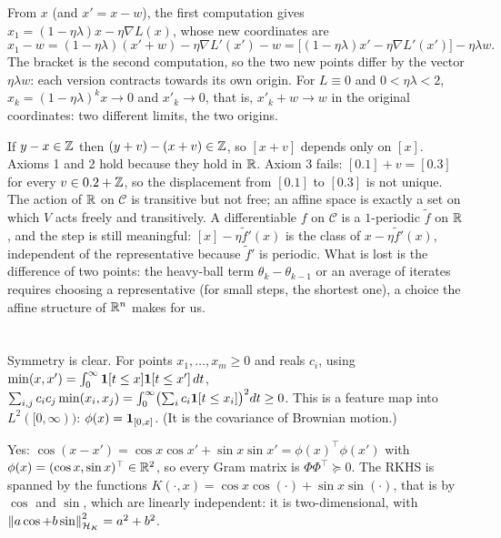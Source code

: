 From $x$ (and $x' = x - w$), the first computation gives $x_1 = (1 - \eta\lambda)x - \eta\nabla L(x)$, whose new
coordinates are
\[
  x_1 - w = (1 - \eta\lambda)(x' + w) - \eta\nabla L'(x') - w = \bigl[(1 - \eta\lambda)x' - \eta\nabla L'(x')\bigr] - \eta\lambda w .
\]
The bracket is the second computation, so the two new points differ by the vector $\eta\lambda w$: each
version contracts towards its own origin. For $L\equiv0$ and $0<\eta\lambda<2$, $x_k = (1 - \eta\lambda)^kx\to0$ and
$x'_k\to0$, that is, $x'_k + w\to w$ in the original coordinates: two different limits, the two origins.

If $y - x\in\mathbb{Z}$ then $(y + v) - (x + v)\in\mathbb{Z}$, so $[x + v]$ depends only on $[x]$. Axioms 1 and 2 hold
because they hold in $\mathbb{R}$. Axiom 3 fails: $[0.1] + v = [0.3]$ for every $v\in0.2 + \mathbb{Z}$, so the displacement
from $[0.1]$ to $[0.3]$ is not unique. The action of $\mathbb{R}$ on $\mathcal C$ is transitive but not free; an affine
space is exactly a set on which $V$ acts freely and transitively. A differentiable $f$ on $\mathcal C$ is a
$1$-periodic $\tilde f$ on $\mathbb{R}$, and the step is still meaningful: $[x] - \eta\tilde f'(x)$ is the class of
$x - \eta\tilde f'(x)$, independent of the representative because $\tilde f'$ is periodic. What is lost is the
difference of two points: the heavy-ball term $\theta_k - \theta_{k-1}$ or an average of iterates requires
choosing a representative (for small steps, the shortest one), a choice the affine structure of
$\mathbb{R}^n$ makes for us.

\section{}

Symmetry is clear. For points $x_1, \ldots, x_m \ge 0$ and reals $c_i$, using $\min(x,x') = \int_0^\infty\mathbf{1}[t\le x]\mathbf{1}[t\le x']\,dt$,
$\sum_{i,j}c_ic_j\min(x_i,x_j) = \int_0^\infty\bigl(\sum_ic_i\mathbf{1}[t\le x_i]\bigr)^2dt \ge 0$.
This is a feature map into $L^2([0,\infty))$: $\phi(x) = \mathbf{1}_{[0,x]}$. (It is the covariance of Brownian motion.)

Yes: $\cos(x - x') = \cos x\cos x' + \sin x\sin x' = \phi(x)^\top\phi(x')$ with $\phi(x) = (\cos x, \sin x)^\top \in \mathbb{R}^2$, so every Gram matrix is $\Phi\Phi^\top \succeq 0$. The RKHS is spanned by the functions $K(\cdot, x) = \cos x\cos(\cdot) + \sin x\sin(\cdot)$, that is by $\cos$ and $\sin$, which are linearly independent: it is two-dimensional, with $\left\|a\cos + b\sin\right\|_{\mathcal H_K}^2 = a^2 + b^2$.

